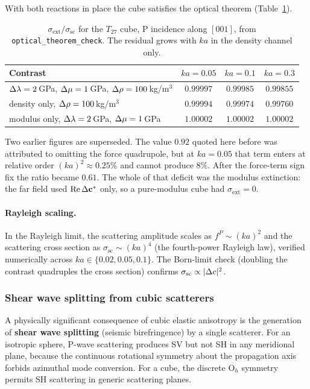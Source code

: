 With both reactions in place the cube satisfies the optical theorem
(Table~\ref{tab:optical-theorem}).
\begin{table}[ht]
\centering
\renewcommand{\arraystretch}{1.2}
\begin{tabular}{lccc}
\toprule
Contrast & $ka = 0.05$ & $ka = 0.1$ & $ka = 0.3$ \\
\midrule
$\Delta\lambda = 2$\,GPa, $\Delta\mu = 1$\,GPa, $\Delta\rho = 100$\,kg/m$^3$
  & $0.99997$ & $0.99985$ & $0.99855$ \\
density only, $\Delta\rho = 100$\,kg/m$^3$
  & $0.99994$ & $0.99974$ & $0.99760$ \\
modulus only, $\Delta\lambda = 2$\,GPa, $\Delta\mu = 1$\,GPa
  & $1.00002$ & $1.00002$ & $1.00002$ \\
\bottomrule
\end{tabular}
\caption{$\sigma_{\mathrm{ext}}/\sigma_{\mathrm{sc}}$ for the $T_{27}$ cube,
P incidence along $[001]$, from \texttt{optical\_theorem\_check}. The residual
grows with $ka$ in the density channel only.}
\label{tab:optical-theorem}
\end{table}
Two earlier figures are superseded. The value $0.92$ quoted here before was
attributed to omitting the force quadrupole, but at $ka = 0.05$ that term
enters at relative order $(ka)^2 \approx 0.25\%$ and cannot produce $8\%$.
After the force-term sign fix the ratio became $0.61$. The whole of that
deficit was the modulus extinction: the far field used
$\operatorname{Re}\Delta\mathbf{c}^*$ only, so a pure-modulus cube had
$\sigma_{\mathrm{ext}} = 0$.

\paragraph{Rayleigh scaling.}
In the Rayleigh limit, the scattering amplitude scales as $f^P \sim (ka)^2$
and the scattering cross section as $\sigma_\mathrm{sc} \sim (ka)^4$
(the fourth-power Rayleigh law), verified numerically across
$ka \in \{0.02, 0.05, 0.1\}$.  The Born-limit check (doubling the contrast
quadruples the cross section) confirms $\sigma_\mathrm{sc} \propto |\Delta c|^2$.

\subsubsection{Shear wave splitting from cubic scatterers}
\label{sec:shear-wave-splitting}

A physically significant consequence of cubic elastic anisotropy is
the generation of \textbf{shear wave splitting} (seismic birefringence)
by a single scatterer.  For an isotropic sphere,
P-wave scattering produces SV but not SH in any meridional plane,
because the continuous rotational symmetry about the propagation axis
forbids azimuthal mode conversion.  For a cube, the discrete O$_h$
symmetry permits SH scattering in generic scattering planes.

